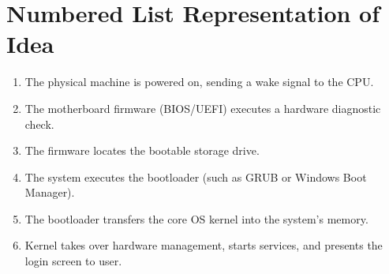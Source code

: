 \documentclass[11pt, a4paper]{article}
\begin{document}
\section*{Numbered List Representation of Idea}
\begin{enumerate}
    \item The physical machine is powered on, sending a wake signal to the CPU.
    \item The motherboard firmware (BIOS/UEFI) executes a hardware diagnostic check.
    \item The firmware locates the bootable storage drive.
    \item The system executes the bootloader (such as GRUB or Windows Boot Manager).
    \item The bootloader transfers the core OS kernel into the system's memory.
    \item Kernel takes over hardware management, starts services, and presents the login screen to user.
\end{enumerate}
\end{document}
